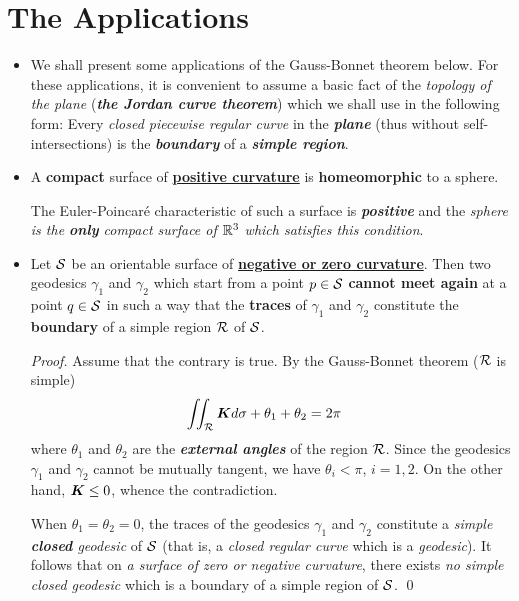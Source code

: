 \documentclass[11pt]{article}
\begin{document}
\section{The Applications}
\begin{itemize}
\item We shall present some applications of the Gauss-Bonnet theorem below. For these applications, it is convenient to assume a basic fact of the \emph{topology of the plane} (\emph{\textbf{the Jordan curve theorem}}) which we shall use in the following form: Every \emph{closed piecewise regular curve} in the \emph{\textbf{plane}} (thus without self-intersections) is the \emph{\textbf{boundary}} of a \emph{\textbf{simple region}}.

\item \begin{proposition} 
A \textbf{compact} surface of \underline{\textbf{positive curvature}} is \textbf{homeomorphic} to a sphere.
\end{proposition}
The Euler-Poincar\'e characteristic of such a surface is \emph{\textbf{positive}} and the \emph{sphere is the \textbf{only} compact surface of ${\mathbb R}^3$ which satisfies this condition}.

\item \begin{proposition}
Let ${\mathcal S}$ be an orientable surface of \underline{\textbf{negative or zero curvature}}. Then two geodesics $\gamma_1$ and $\gamma_2$ which start from a point $p \in {\mathcal S}$ \textbf{cannot meet again} at a point $q \in {\mathcal S}$ in such a way that the \textbf{traces} of $\gamma_1$ and $\gamma_2$ constitute the \textbf{boundary} of a simple region ${\mathcal R}$ of ${\mathcal S}$.
\end{proposition}
\begin{proof}
Assume that the contrary is true. By the Gauss-Bonnet theorem (${\mathcal R}$ is simple)
\begin{align*}
\iint_{{\mathcal R}}\boldsymbol{K}d\sigma + \theta_1 + \theta_{2} &= 2\pi
\end{align*}
where $\theta_1$ and $\theta_{2}$ are the \emph{\textbf{external angles}} of the region ${\mathcal R}$. Since the geodesics $\gamma_1$ and $\gamma_2$ cannot be mutually tangent, we have $\theta_i < \pi$, $i = 1, 2$. On the other hand, $\boldsymbol{K} \le 0$, whence the contradiction.


When $\theta_1 = \theta_2 = 0$, the traces of the geodesics $\gamma_1$ and $\gamma_2$ constitute a \emph{simple \textbf{closed} geodesic} of ${\mathcal S}$ (that is, a \emph{closed regular curve} which is a \emph{geodesic}). It follows that on \emph{a surface of zero or negative curvature}, there exists \emph{no simple closed geodesic} which is a boundary of a simple region of ${\mathcal S}$. \qed
\end{proof}


\end{itemize}
\end{document}

